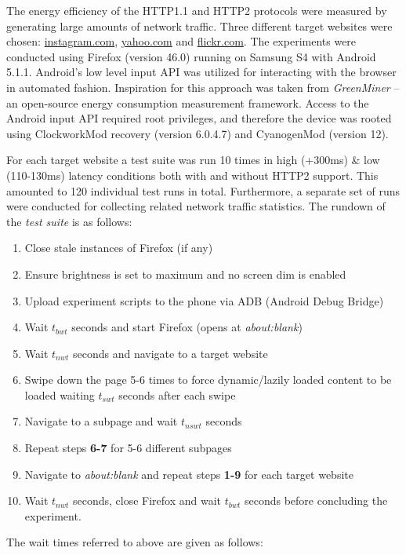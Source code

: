 \documentclass[noback]{cuposter}
\begin{document}
The energy efficiency of the HTTP1.1 and HTTP2 protocols were measured by generating large amounts of network traffic. Three different target websites were chosen: \url{instagram.com}, \url{yahoo.com} and \url{flickr.com}. The experiments were conducted using Firefox (version 46.0) running on Samsung S4 with Android 5.1.1. Android’s low level input API was utilized for interacting with the browser in automated fashion. Inspiration for this approach was taken from \emph{GreenMiner} -- an open-source energy consumption measurement framework. Access to the Android input API required root privileges, and therefore the device was rooted using ClockworkMod recovery (version 6.0.4.7) and CyanogenMod (version 12).

For each target website a test suite was run 10 times in high (+300ms) \& low (110-130ms) latency conditions both with and without HTTP2 support. This amounted to 120 individual test runs in total. Furthermore, a separate set of runs were conducted for collecting related network traffic statistics. The rundown of the \emph{test suite} is as follows:

\begin{enumerate}[label=\textbf{\arabic*}.]
    \item Close stale instances of Firefox (if any)
    \item Ensure brightness is set to maximum and no screen dim is enabled
    \item Upload experiment scripts to the phone via ADB (Android Debug Bridge)
    \item Wait $t_{bwt}$ seconds and start Firefox (opens at \emph{about:blank})
    \item Wait $t_{nwt}$ seconds and navigate to a target website
    \item Swipe down the page 5-6 times to force dynamic/lazily loaded content to be loaded waiting $t_{swt}$ seconds after each swipe
    \item Navigate to a subpage and wait $t_{nswt}$ seconds
    \item Repeat steps \textbf{6-7} for 5-6 different subpages
    \item Navigate to \emph{about:blank} and repeat steps \textbf{1-9} for each target website
    \item Wait $t_{nwt}$ seconds, close Firefox and wait $t_{bwt}$ seconds before concluding the experiment.
\end{enumerate}

The wait times referred to above are given as follows:
\end{document}
